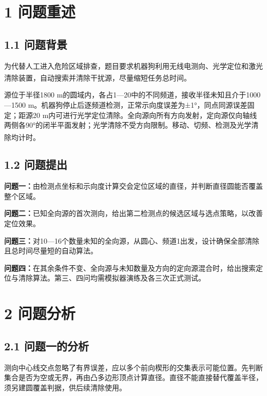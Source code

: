 \documentclass[UTF8,fontset=none,zihao=-4,a4paper]{ctexart}
\begin{document}
\section{1 问题重述}\label{ux95eeux9898ux91cdux8ff0}

\subsection{1.1 问题背景}\label{ux95eeux9898ux80ccux666f}

为代替人工进入危险区域排查，题目要求机器狗利用无线电测向、光学定位和激光清除装置，自动搜索并清除干扰源，尽量缩短任务总时间\textsuperscript{\cite{problem}}。

源位于半径1800 m的圆域内，各占1---20中的不同频道，接收半径未知且介于1000---1500 m。机器狗停止后逐频道检测，正常示向度误差为±1°，同点同源误差固定；距源20 m内可进行光学定位清除。全向源向所有方向发射，定向源仅向轴线两侧各90°的闭半平面发射；光学清除不受方向限制。移动、切频、检测及光学清除均计时\textsuperscript{\cite{problem,simulator,interface}}。

\subsection{1.2 问题提出}\label{ux95eeux9898ux63d0ux51fa}

\textbf{问题一：}由检测点坐标和示向度计算交会定位区域的直径，并判断直径圆能否覆盖整个区域。

\textbf{问题二：}已知全向源的首次测向，给出第二检测点的候选区域与选点策略，以改善定位效果。

\textbf{问题三：}对10---16个数量未知的全向源，从圆心、频道1出发，设计确保全部清除且总时间尽量短的自动算法。

\textbf{问题四：}在其余条件不变、全向源与未知数量及方向的定向源混合时，给出搜索定位与清除算法。第三、四问均需模拟器演练及各三次正式测试。

\section{2 问题分析}\label{ux95eeux9898ux5206ux6790}

\subsection{2.1 问题一的分析}\label{ux95eeux9898ux4e00ux7684ux5206ux6790}

测向中心线交点忽略了有界误差，应以多个前向楔形的交集表示可能位置。先判断集合是否为空或无界，再由凸多边形顶点计算直径。直径不能直接替代覆盖半径，须另建圆覆盖判据，供后续清除使用。
\end{document}
